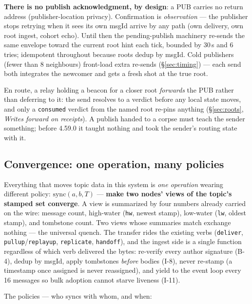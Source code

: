 \documentclass[nobib]{tufte-handout}
\begin{document}
\textbf{There is no publish acknowledgment, by design}: a PUB carries no
return address (publisher-location privacy). Confirmation is
\emph{observation} --- the publisher stops retrying when it sees its own
msgId arrive by any path (own delivery, own root ingest, cohort echo).
Until then the pending-publish machinery re-sends the same envelope
toward the current root hint each tick, bounded by 30\,s and 6 tries;
idempotent throughout because roots dedup by msgId. Cold publishers
(fewer than 8 neighbours) front-load extra re-sends
(\S\ref{sec:timing}) --- each send both integrates the newcomer and gets
a fresh shot at the true root.

En route, a relay holding a beacon for a closer root \emph{forwards}
the PUB rather than deferring to it: the send resolves to a verdict
before any local state moves, and only a \texttt{consumed} verdict from
the named root re-pins anything (\S\ref{sec:roots}, \emph{Writes
forward on receipts}). A publish handed to a corpse must teach the
sender something; before 4.59.0 it taught nothing and took the
sender's routing state with it.

\subsection{Convergence: one operation, many policies}

Everything that moves topic data in this system is \emph{one operation}
wearing different policy: $\mathrm{sync}(a, b, T)$ --- \textbf{make two
nodes' views of the topic's stamped set converge}. A view is summarized
by four numbers already carried on the wire: message count, high-water
(\texttt{hw}, newest stamp), low-water (\texttt{lw}, oldest stamp), and
tombstone count. Two views whose summaries match exchange nothing ---
the universal quench. The transfer rides the existing verbs
(\texttt{deliver}, \texttt{pullup}/\texttt{replayup},
\texttt{replicate}, \texttt{handoff}), and the ingest side is a single
function regardless of which verb delivered the bytes: re-verify every
author signature (B-4), dedup by msgId, apply tombstones \emph{before}
bodies (I-8), never re-stamp (a timestamp once assigned is never
reassigned), and yield to the event loop every 16 messages so bulk
adoption cannot starve liveness (I-11).

The policies --- who syncs with whom, and when:
\end{document}
